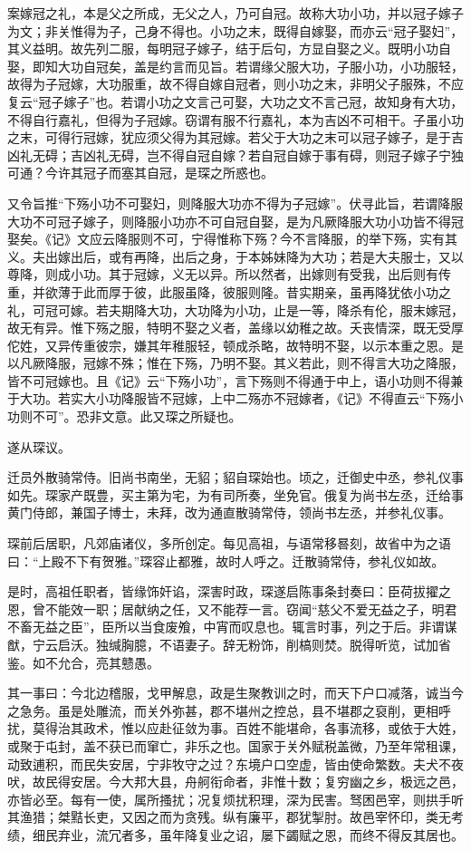 \documentclass[12pt,UTF8]{ctexbook}
\begin{document}
案嫁冠之礼，本是父之所成，无父之人，乃可自冠。故称大功小功，并以冠子嫁子为文；非关惟得为子，己身不得也。小功之末，既得自嫁娶，而亦云“冠子娶妇”，其义益明。故先列二服，每明冠子嫁子，结于后句，方显自娶之义。既明小功自娶，即知大功自冠矣，盖是约言而见旨。若谓缘父服大功，子服小功，小功服轻，故得为子冠嫁，大功服重，故不得自嫁自冠者，则小功之末，非明父子服殊，不应复云“冠子嫁子”也。若谓小功之文言己可娶，大功之文不言己冠，故知身有大功，不得自行嘉礼，但得为子冠嫁。窃谓有服不行嘉礼，本为吉凶不可相干。子虽小功之末，可得行冠嫁，犹应须父得为其冠嫁。若父于大功之末可以冠子嫁子，是于吉凶礼无碍；吉凶礼无碍，岂不得自冠自嫁？若自冠自嫁于事有碍，则冠子嫁子宁独可通？今许其冠子而塞其自冠，是琛之所惑也。

又令旨推“下殇小功不可娶妇，则降服大功亦不得为子冠嫁”。伏寻此旨，若谓降服大功不可冠子嫁子，则降服小功亦不可自冠自娶，是为凡厥降服大功小功皆不得冠娶矣。《记》文应云降服则不可，宁得惟称下殇？今不言降服，的举下殇，实有其义。夫出嫁出后，或有再降，出后之身，于本姊妹降为大功；若是大夫服士，又以尊降，则成小功。其于冠嫁，义无以异。所以然者，出嫁则有受我，出后则有传重，并欲薄于此而厚于彼，此服虽降，彼服则隆。昔实期亲，虽再降犹依小功之礼，可冠可嫁。若夫期降大功，大功降为小功，止是一等，降杀有伦，服末嫁冠，故无有异。惟下殇之服，特明不娶之义者，盖缘以幼稚之故。夭丧情深，既无受厚佗姓，又异传重彼宗，嫌其年稚服轻，顿成杀略，故特明不娶，以示本重之恩。是以凡厥降服，冠嫁不殊；惟在下殇，乃明不娶。其义若此，则不得言大功之降服，皆不可冠嫁也。且《记》云“下殇小功”，言下殇则不得通于中上，语小功则不得兼于大功。若实大小功降服皆不冠嫁，上中二殇亦不冠嫁者，《记》不得直云“下殇小功则不可”。恐非文意。此又琛之所疑也。

遂从琛议。

迁员外散骑常侍。旧尚书南坐，无貂；貂自琛始也。顷之，迁御史中丞，参礼仪事如先。琛家产既豊，买主第为宅，为有司所奏，坐免官。俄复为尚书左丞，迁给事黄门侍郎，兼国子博士，未拜，改为通直散骑常侍，领尚书左丞，并参礼仪事。

琛前后居职，凡郊庙诸仪，多所创定。每见高祖，与语常移晷刻，故省中为之语曰：“上殿不下有贺雅。”琛容止都雅，故时人呼之。迁散骑常侍，参礼仪如故。

是时，高祖任职者，皆缘饰奸谄，深害时政，琛遂启陈事条封奏曰：臣荷拔擢之恩，曾不能效一职；居献纳之任，又不能荐一言。窃闻“慈父不爱无益之子，明君不畜无益之臣”，臣所以当食废飧，中宵而叹息也。辄言时事，列之于后。非谓谋猷，宁云启沃。独缄胸臆，不语妻子。辞无粉饰，削槁则焚。脱得听览，试加省鉴。如不允合，亮其戆愚。

其一事曰：今北边稽服，戈甲解息，政是生聚教训之时，而天下户口减落，诚当今之急务。虽是处雕流，而关外弥甚，郡不堪州之控总，县不堪郡之裒削，更相呼扰，莫得治其政术，惟以应赴征敛为事。百姓不能堪命，各事流移，或依于大姓，或聚于屯封，盖不获已而窜亡，非乐之也。国家于关外赋税盖微，乃至年常租课，动致逋积，而民失安居，宁非牧守之过？东境户口空虚，皆由使命繁数。夫犬不夜吠，故民得安居。今大邦大县，舟舸衔命者，非惟十数；复穷幽之乡，极远之邑，亦皆必至。每有一使，属所搔扰；况复烦扰积理，深为民害。驽困邑宰，则拱手听其渔猎；桀黠长吏，又因之而为贪残。纵有廉平，郡犹掣肘。故邑宰怀印，类无考绩，细民弃业，流冗者多，虽年降复业之诏，屡下蠲赋之恩，而终不得反其居也。
\end{document}
